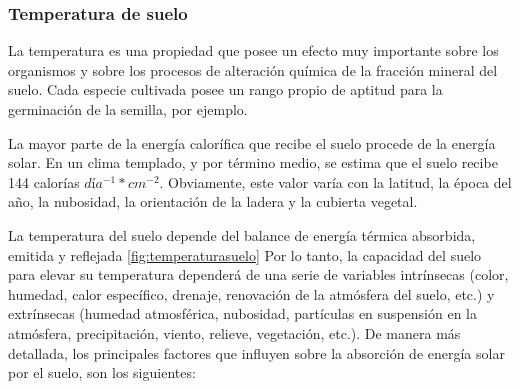 \subsubsection{Temperatura de suelo}
La temperatura es una propiedad que posee un efecto muy importante sobre los
organismos y sobre los procesos de alteración química de la fracción mineral
del suelo. Cada especie cultivada posee un rango propio de aptitud para la
germinación de la semilla, por ejemplo.  

La mayor parte de la energía calorífica que recibe el suelo procede de la
energía solar. En un clima templado, y por término medio, se estima que el
suelo recibe 144 calorías $día^{-1}* cm^{-2}$.  Obviamente, este valor varía con la
latitud, la época del año, la nubosidad, la orientación de la ladera y la
cubierta vegetal. 

La temperatura del suelo depende del balance de energía térmica absorbida,
emitida y reflejada \ref{fig:temperaturasuelo} Por lo tanto, la capacidad del suelo para
elevar su temperatura dependerá de una serie de variables intrínsecas (color,
humedad, calor específico, drenaje, renovación de la atmósfera del suelo, etc.)
y extrínsecas (humedad atmosférica, nubosidad, partículas en suspensión en la
atmósfera, precipitación, viento, relieve, vegetación, etc.). De manera más
detallada, los principales factores que influyen sobre la absorción de energía
solar por el suelo, son los siguientes: 

